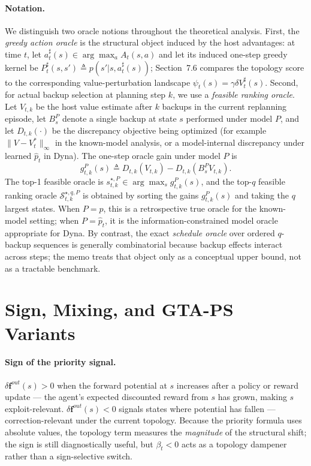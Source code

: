 \documentclass[10pt,a4paper]{article}
\begin{document}
\paragraph{Notation.}
We distinguish two oracle notions throughout the theoretical analysis. First, the \emph{greedy action oracle} is the structural object induced by the host advantages: at time $t$, let $a_t^{\sharp}(s)\in\arg\max_a A_t(s,a)$ and let its induced one-step greedy kernel be $P_t^{\sharp}(s,s') \triangleq p(s'|s,a_t^{\sharp}(s))$; Section~7.6 compares the topology score to the corresponding value-perturbation landscape $\psi_t(s)=\gamma\delta V_t^{\sharp}(s)$. Second, for actual backup selection at planning step $k$, we use a \emph{feasible ranking oracle}. Let $V_{t,k}$ be the host value estimate after $k$ backups in the current replanning episode, let $B_s^{P}$ denote a single backup at state $s$ performed under model $P$, and let $D_{t,k}(\cdot)$ be the discrepancy objective being optimized (for example $\|V-V_t^*\|_\infty$ in the known-model analysis, or a model-internal discrepancy under learned $\hat p_t$ in Dyna). The one-step oracle gain under model $P$ is
\[
  g_{t,k}^{P}(s) \triangleq D_{t,k}(V_{t,k}) - D_{t,k}(B_s^{P}V_{t,k}).
\]
The top-1 feasible oracle is $s_{t,k}^{\star,P}\in\arg\max_s g_{t,k}^{P}(s)$, and the top-$q$ feasible ranking oracle $\mathcal{S}_{t,k}^{\star,q,P}$ is obtained by sorting the gains $g_{t,k}^{P}(s)$ and taking the $q$ largest states. When $P=p$, this is a retrospective true oracle for the known-model setting; when $P=\hat p_t$, it is the information-constrained model oracle appropriate for Dyna. By contrast, the exact \emph{schedule oracle} over ordered $q$-backup sequences is generally combinatorial because backup effects interact across steps; the memo treats that object only as a conceptual upper bound, not as a tractable benchmark.



\section{Sign, Mixing, and GTA-PS Variants}


\paragraph{Sign of the priority signal.}
$\delta\mathbf{f}^{out}(s) > 0$ when the forward potential at $s$ increases after
a policy or reward update --- the agent's expected discounted reward from $s$ has
grown, making $s$ exploit-relevant.  $\delta\mathbf{f}^{out}(s) < 0$ signals states
where potential has fallen --- correction-relevant under the current topology.
Because the priority formula uses absolute values, the topology term measures the
\emph{magnitude} of the structural shift; the sign is still diagnostically useful,
but $\beta_t < 0$ acts as a topology dampener rather than a sign-selective switch.
\end{document}
